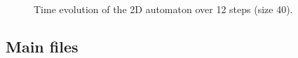\documentclass[12pt,a4paper]{article}
\begin{document}
\begin{figure}[H]
\begin{minipage}[b]{0.25\textwidth}
        \caption*{\small $t=11$}
    \end{minipage}
    \hspace{0.1cm}
    \begin{minipage}[b]{0.25\textwidth}
        \centering
        \caption*{\small $t=12$}
    \end{minipage}
    \vspace{0.3cm}


    \caption{\small Time evolution of the 2D automaton over 12 steps (size 40).}
    \label{fig:2d_evolution}
\end{figure}


\newpage


\subsection{Main files}
\end{document}
